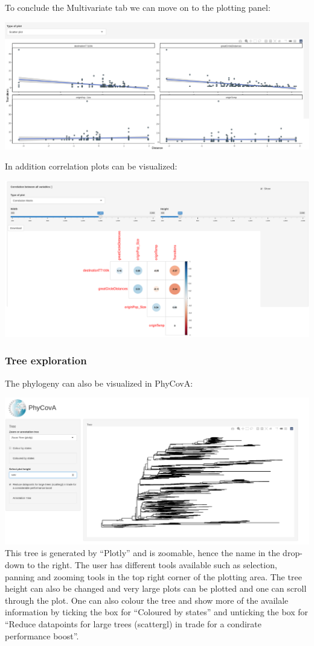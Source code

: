 \documentclass[
]{article}
\begin{document}
To conclude the Multivariate tab we can move on to the plotting panel:

\includegraphics{tutorial_img/scatter_multi.png}

In addition correlation plots can be visualized:

\includegraphics{tutorial_img/Corplotpng.png}

\hypertarget{tree-exploration}{%
\subsubsection{Tree exploration}\label{tree-exploration}}

The phylogeny can also be visualized in PhyCovA:

\includegraphics{tutorial_img/Tree_initial.png} This tree is generated
by ``Plotly'' and is zoomable, hence the name in the drop-down to the
right. The user has different tools available such as selection, panning
and zooming tools in the top right corner of the plotting area. The tree
height can also be changed and very large plots can be plotted and one
can scroll through the plot. One can also colour the tree and show more
of the availale information by ticking the box for ``Coloured by
states'' and unticking the box for ``Reduce datapoints for large trees
(scattergl) in trade for a condirate performance boost''.
\end{document}
